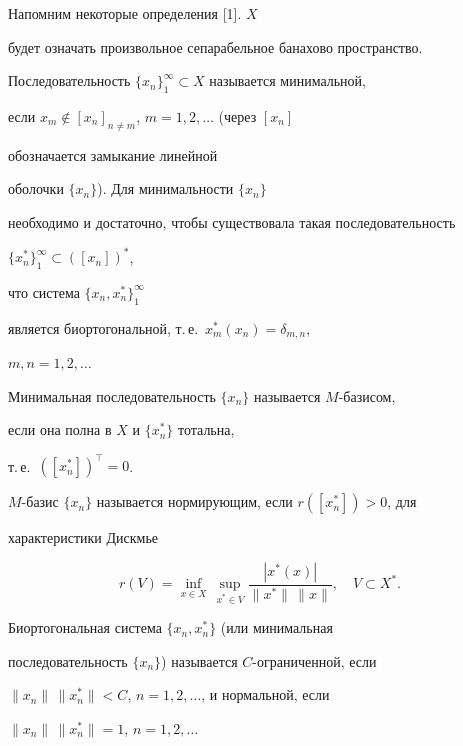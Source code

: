  




\maketitle 


\label{begin} 


 


 


Напомним некоторые определения [1]. $X$ 


будет означать произвольное сепарабельное банахово пространство. 


Последовательность $\{x_n\}^\infty_1\subset X$ называется минимальной, 


если $x_m\notin[x_n]_{n\ne m}$, $m=1,2,\dotsc$ (через $[x_n]$ 


обозначается замыкание линейной 


оболочки $\{x_n\}$). Для минимальности $\{x_n\}$ 


необходимо и достаточно, чтобы существовала такая последовательность 


$\{x^*_n\}^\infty_1\subset([x_n])^*$, 


что система $\{x_n,x^*_n\}^\infty_1$ 


является биортогональной, т.\,е.~$x^*_m(x_n)=\delta_{m,n}$, 


$m,n=1,2,\dotsc$ 


Минимальная последовательность $\{x_n\}$ называется $M$-базисом, 


если она полна в $X$ и $\{x^*_n\}$ тотальна, 


т.\,е.~$([x^*_n])^\top=0$.\; 


$M$-базис $\{x_n\}$ называется нормирующим, если $r([x^*_n])>0$, для 


характеристики Дискмье 


$$ 


r(V)=\inf_{x\in X}\,\sup_{x^*\in V} 


\frac{|x^*(x)|}{\|x^*\|\,\|x\|},\quad V\subset X^*. 


$$ 


Биортогональная система $\{x_n,x^*_n\}$ (или минимальная 


последовательность $\{x_n\}$) называется $C$-ограниченной, если 


$\|x_n\|\,\|x^*_n\|<C$, $n=1,2,\dotsc$, и нормальной, если 


$\|x_n\|\,\|x^*_n\|=1$, $n=1,2,\dotsc$ 


